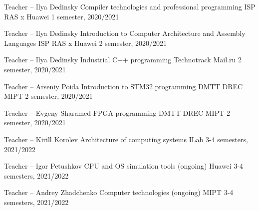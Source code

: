 
\begin{cventries}

  \cventry
    {Teacher -- Ilya Dedinsky} %
    {Compiler technologies and professional programming} %
    {ISP RAS x Huawei} %
    {1 semester, 2020/2021} %
    {} {}

  \cventry
    {Teacher -- Ilya Dedinsky} %
    {Introduction to Computer Architecture and Assembly Languages} %
    {ISP RAS x Huawei} %
    {2 semester, 2020/2021} %
    {} {}

  \cventry
    {Teacher -- Ilya Dedinsky} %
    {Industrial C++ programming} %
    {Technotrack Mail.ru} %
    {2 semester, 2020/2021} %
    {} {}

  \cventry
    {Teacher -- Arseniy Poida} %
    {Introduction to STM32 programming} %
    {DMTT DREC MIPT} %
    {2 semester, 2020/2021} %
    {} {}

  \cventry
    {Teacher -- Evgeny Sharamed} %
    {FPGA programming} %
    {DMTT DREC MIPT} %
    {2 semester, 2020/2021} %
    {} {}

  \cventry
    {Teacher -- Kirill Korolev} %
    {Architecture of computing systems} %
    {ILab} %
    {3-4 semesters, 2021/2022} %
    {} {}

  \cventry
    {Teacher -- Igor Petushkov} %
    {CPU and OS simulation tools (ongoing)} %
    {Huawei} %
    {3-4 semesters, 2021/2022} %
    {} {}

  \cventry
    {Teacher -- Andrey Zhadchenko} %
    {Computer technologies (ongoing)} %
    {MIPT} %
    {3-4 semesters, 2021/2022} %
    {} {}

\end{cventries}
